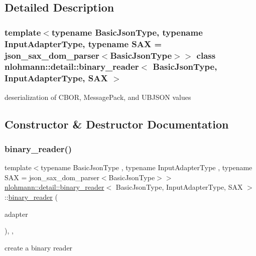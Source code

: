 \subsection{Detailed Description}
\subsubsection*{template$<$typename Basic\+Json\+Type, typename Input\+Adapter\+Type, typename S\+AX = json\+\_\+sax\+\_\+dom\+\_\+parser$<$\+Basic\+Json\+Type$>$$>$\newline
class nlohmann\+::detail\+::binary\+\_\+reader$<$ Basic\+Json\+Type, Input\+Adapter\+Type, S\+A\+X $>$}

deserialization of C\+B\+OR, Message\+Pack, and U\+B\+J\+S\+ON values 

\subsection{Constructor \& Destructor Documentation}
\mbox{\label{classnlohmann_1_1detail_1_1binary__reader_a2aee4c3507eca623f7cec32544fdc5b2}} 
\subsubsection{\texorpdfstring{binary\+\_\+reader()}{binary\_reader()}}
{\footnotesize\ttfamily template$<$typename Basic\+Json\+Type , typename Input\+Adapter\+Type , typename S\+AX  = json\+\_\+sax\+\_\+dom\+\_\+parser$<$\+Basic\+Json\+Type$>$$>$ \\
\hyperlink{classnlohmann_1_1detail_1_1binary__reader}{nlohmann\+::detail\+::binary\+\_\+reader}$<$ Basic\+Json\+Type, Input\+Adapter\+Type, S\+AX $>$\+::\hyperlink{classnlohmann_1_1detail_1_1binary__reader}{binary\+\_\+reader} (\begin{DoxyParamCaption}\item[{Input\+Adapter\+Type \&\&}]{adapter }\end{DoxyParamCaption})\hspace{0.3cm}{\ttfamily [inline]}, {\ttfamily [explicit]}, {\ttfamily [noexcept]}}



create a binary reader 


